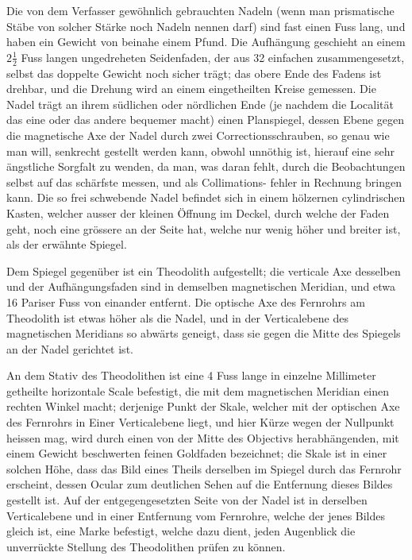 Die von dem Verfasser gewöhnlich gebrauchten Nadeln (wenn man prismatische
Stäbe von solcher Stärke noch Nadeln nennen darf) sind fast einen Fuss
lang, und haben ein Gewicht von beinahe einem Pfund. Die Aufhängung
geschieht an einem $2\tfrac12$ Fuss langen ungedreheten Seidenfaden, der
aus 32 einfachen zusammengesetzt, selbst das doppelte Gewicht noch
sicher trägt; das obere Ende des Fadens ist drehbar, und die Drehung
wird an einem eingetheilten Kreise gemessen. Die Nadel trägt an ihrem
südlichen oder nördlichen Ende (je nachdem die Localität das eine oder
das andere bequemer macht) einen Planspiegel, dessen Ebene gegen die
magnetische Axe der Nadel durch zwei Correctionsschrauben, so genau
wie man will, senkrecht gestellt werden kann, obwohl unnöthig ist,
hierauf eine sehr ängstliche Sorgfalt zu wenden, da man, was daran
fehlt, durch die Beobachtungen selbst auf das schärfste messen,
und als Collimations-
\clearpage
{}
\noindent
fehler in Rechnung bringen kann.
Die so frei schwebende Nadel befindet sich in einem hölzernen
cylindrischen Kasten, welcher ausser der kleinen Öffnung im Deckel,
durch welche der Faden geht, noch eine grössere an der Seite hat,
welche nur wenig höher und breiter ist, als der erwähnte Spiegel.

Dem Spiegel gegenüber ist ein Theodolith aufgestellt; die verticale Axe
desselben und der Aufhängungsfaden sind in demselben magnetischen Meridian,
und etwa 16 Pariser Fuss von einander entfernt. Die optische Axe des
Fernrohrs am Theodolith ist etwas höher als die Nadel, und in der
Verticalebene des magnetischen Meridians so abwärts geneigt, dass sie
gegen die Mitte des Spiegels an der Nadel gerichtet ist.

An dem Stativ des Theodolithen ist eine 4 Fuss lange in einzelne Millimeter
getheilte horizontale Scale befestigt, die mit dem magnetischen Meridian
einen rechten Winkel macht; derjenige Punkt der Skale, welcher mit der
optischen Axe des Fernrohrs in Einer Verticalebene liegt, und hier Kürze
wegen der Nullpunkt heissen mag, wird durch einen von der Mitte des
Objectivs herabhängenden, mit einem Gewicht beschwerten feinen Goldfaden
bezeichnet; die Skale ist in einer solchen Höhe, dass das Bild eines
Theils derselben im Spiegel durch das Fernrohr erscheint, dessen Ocular
zum deutlichen Sehen auf die Entfernung dieses Bildes gestellt ist.
Auf der entgegengesetzten Seite von der Nadel ist in derselben
Verticalebene und in einer Entfernung vom Fernrohre, welche der jenes
Bildes gleich ist, eine Marke befestigt, welche dazu dient, jeden
Augenblick die unverrückte Stellung des Theodolithen prüfen zu können.


